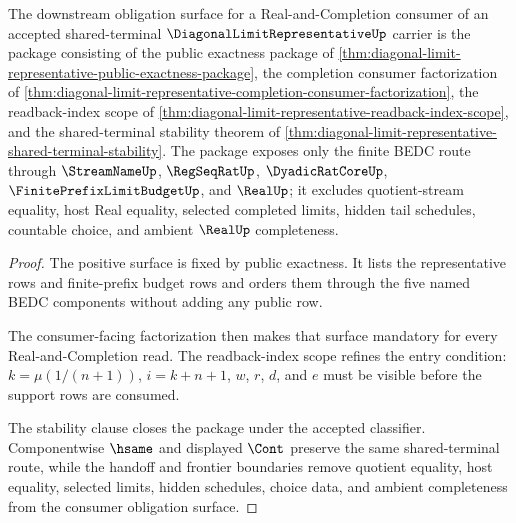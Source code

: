 \begin{theorem}
\label{thm:diagonal-limit-representative-frontier-consumer-obligation-package}
The downstream obligation surface for a Real-and-Completion consumer of an accepted shared-terminal $\DiagonalLimitRepresentativeUp$ carrier is the package consisting of the public exactness package of \autoref{thm:diagonal-limit-representative-public-exactness-package}, the completion consumer factorization of \autoref{thm:diagonal-limit-representative-completion-consumer-factorization}, the readback-index scope of \autoref{thm:diagonal-limit-representative-readback-index-scope}, and the shared-terminal stability theorem of \autoref{thm:diagonal-limit-representative-shared-terminal-stability}. The package exposes only the finite BEDC route through $\StreamNameUp$, $\RegSeqRatUp$, $\DyadicRatCoreUp$, $\FinitePrefixLimitBudgetUp$, and $\RealUp$; it excludes quotient-stream equality, host Real equality, selected completed limits, hidden tail schedules, countable choice, and ambient $\RealUp$ completeness.
\end{theorem}
\begin{proof}
The positive surface is fixed by public exactness. It lists the representative rows and finite-prefix budget rows and orders them through the five named BEDC components without adding any public row.

The consumer-facing factorization then makes that surface mandatory for every Real-and-Completion read. The readback-index scope refines the entry condition: $k=\mu(1/(n+1))$, $i=k+n+1$, $w$, $r$, $d$, and $e$ must be visible before the support rows are consumed.

The stability clause closes the package under the accepted classifier. Componentwise $\hsame$ and displayed $\Cont$ preserve the same shared-terminal route, while the handoff and frontier boundaries remove quotient equality, host equality, selected limits, hidden schedules, choice data, and ambient completeness from the consumer obligation surface.
\end{proof}

